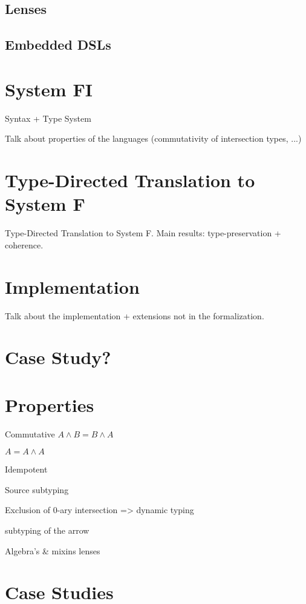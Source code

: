\documentclass[twocolumn]{article}
\begin{document}
\subsection{Lenses}

\subsection{Embedded DSLs} 

\section{System FI}

Syntax + Type System 

Talk about properties of the languages 
(commutativity of intersection types, ...)

\section{Type-Directed Translation to System F}

Type-Directed Translation to System F. 
Main results: type-preservation + coherence. 

\section{Implementation}

Talk about the implementation + extensions not in the formalization. 

\section{Case Study?}

\section{Properties}

Commutative
$ A \wedge B = B \wedge A $

$ A = A \wedge A $

Idempotent

Source subtyping

Exclusion of $0$-ary intersection => dynamic typing

subtyping of the arrow

Algebra's \& mixins
lenses

\section{Case Studies}
\end{document}
